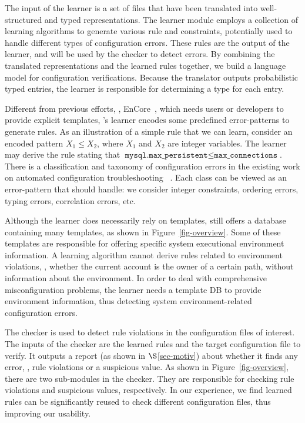 The input of the learner is a set of files that have been translated
into well-structured and typed representations.
The learner module employs a collection of learning algorithms
to generate various rule and constraints,
potentially used to handle different types of configuration errors.
These rules are the output of the learner, and will be 
used by the checker to detect errors.
By combining the translated representations and the learned
rules together, we build a language model for
configuration verifications.
Because the translator outputs probabilistic typed entries,
the learner is responsible for determining a type for each entry.

Different from previous efforts, \eg, EnCore~\cite{zhang14encore},
which needs users or developers to provide explicit templates,
\app's learner encodes some predefined error-patterns 
to generate rules. 
As an illustration of a simple rule that we can learn,
consider an encoded pattern $X_1 \le X_2$, where $X_1$ and $X_2$ are
integer variables. The learner may derive the rule stating that
$\texttt{mysql.max\_persistent} \le \texttt{max\_connections}$. 
There is a classification and taxonomy of configuration errors in the 
existing work on automated configuration troubleshooting%
~\cite{yin11anempirical, configdataset}. 
Each class can be viewed as an error-pattern 
that \app should handle: we consider integer constraints, 
ordering errors, typing errors, correlation errors, etc.

Although the learner does necessarily rely on templates,
\app still offers a database containing many templates,
as shown in Figure~\ref{fig-overview}.
Some of these templates are responsible for offering
specific system executional environment information.
A learning algorithm cannot derive rules related to environment violations, \eg,
whether the current account is the owner of a certain path, without information 
about the environment. In order to deal with comprehensive misconfiguration problems,
the learner needs a template DB to provide environment information,
thus detecting system environment-related configuration errors.

The checker is used to detect rule violations in the configuration
files of interest. The inputs of the checker are the learned rules 
and the target configuration file to verify.
It outputs a report (as shown in $\S$\ref{sec-motiv}) about 
whether it finds any error, \eg, rule violations or a suspicious value.
As shown in Figure~\ref{fig-overview},
there are two sub-modules in the checker. They are responsible for
checking rule violations and suspicious values, respectively.
In our experience, we find learned rules can be significantly reused
to check different configuration files, thus improving our usability.  

